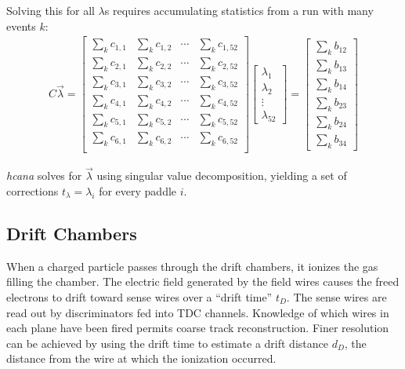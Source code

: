 \begin{itemize}
Solving this for all $\lambda$s requires accumulating statistics from a run with
many events $k$:
\begin{gather}
    C\vec{\lambda}
    =
    \begin{bmatrix}
        \sum_k c_{1,1} & \sum_k c_{1,2} & \cdots & \sum_k c_{1,52} \\
        \sum_k c_{2,1} & \sum_k c_{2,2} & \cdots & \sum_k c_{2,52} \\
        \sum_k c_{3,1} & \sum_k c_{3,2} & \cdots & \sum_k c_{3,52} \\
        \sum_k c_{4,1} & \sum_k c_{4,2} & \cdots & \sum_k c_{4,52} \\
        \sum_k c_{5,1} & \sum_k c_{5,2} & \cdots & \sum_k c_{5,52} \\
        \sum_k c_{6,1} & \sum_k c_{6,2} & \cdots & \sum_k c_{6,52} \\
    \end{bmatrix}
    \left[ \begin{array}{c} \lambda_1 \\ \lambda_2 \\ \vdots \\ \lambda_{52} \end{array} \right]
    =
    \left[ \begin{array}{c}  \sum_k b_{12} \\  \sum_k b_{13} \\  \sum_k b_{14} \\  \sum_k b_{23} \\  \sum_k b_{24} \\  \sum_k b_{34}  \end{array} \right]
\end{gather}

\textit{hcana} solves for $\vec{\lambda}$ using singular value
decomposition, yielding a set of corrections $t_\lambda = \lambda_i$ for every
paddle $i$.


\end{itemize}

\subsection{Drift Chambers} \label{sec:dc_calib}
When a charged particle passes through the drift chambers, it ionizes the gas
filling the chamber.
The electric field generated by the field wires causes the freed electrons to
drift toward sense wires over a ``drift time'' $t_D$.
The sense wires are read out by discriminators fed into TDC channels.
Knowledge of which wires in each plane have been fired permits coarse track
reconstruction.
Finer resolution can be achieved by using the drift time to estimate a drift
distance $d_D$, the distance from the wire at which the ionization occurred.


